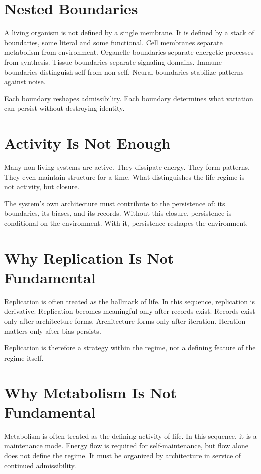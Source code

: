 \documentclass[11pt,twoside,openright]{book}
\begin{document}
\section*{Nested Boundaries}

A living organism is not defined by a single membrane. It is defined by a stack of boundaries, some literal and some functional. Cell membranes separate metabolism from environment. Organelle boundaries separate energetic processes from synthesis. Tissue boundaries separate signaling domains. Immune boundaries distinguish self from non-self. Neural boundaries stabilize patterns against noise.

Each boundary reshapes admissibility. Each boundary determines what variation can persist without destroying identity.

\section*{Activity Is Not Enough}

Many non-living systems are active. They dissipate energy. They form patterns. They even maintain structure for a time. What distinguishes the life regime is not activity, but closure.

The system's own architecture must contribute to the persistence of: its boundaries, its biases, and its records. Without this closure, persistence is conditional on the environment. With it, persistence reshapes the environment.

\section*{Why Replication Is Not Fundamental}

Replication is often treated as the hallmark of life. In this sequence, replication is derivative. Replication becomes meaningful only after records exist. Records exist only after architecture forms. Architecture forms only after iteration. Iteration matters only after bias persists.

Replication is therefore a strategy within the regime, not a defining feature of the regime itself.

\section*{Why Metabolism Is Not Fundamental}

Metabolism is often treated as the defining activity of life. In this sequence, it is a maintenance mode. Energy flow is required for self-maintenance, but flow alone does not define the regime. It must be organized by architecture in service of continued admissibility.
\end{document}
